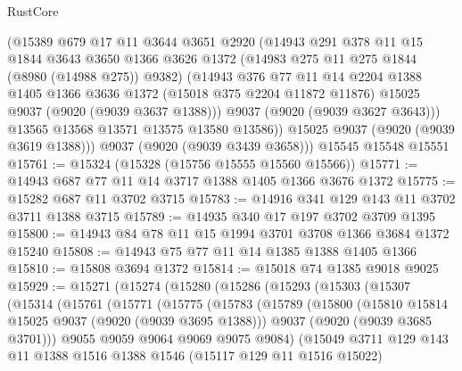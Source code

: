 \begin{lexlean}{RustCore}
\begin{coremodule}
          (@15389
            @679
            @17
            @11
            @3644
            @3651
            @2920
            (@14943
              @291
              @378
              @11
              @15
              @1844
              @3643
              @3650
              @1366
              @3626
              @1372
              (@14983 @275 @11 @275 @1844 (@8980 (@14988 @275)) @9382)
              (@14943
                @376
                @77
                @11
                @14
                @2204
                @1388
                @1405
                @1366
                @3636
                @1372
                (@15018 @375 @2204 @11872 @11876)
                @15025
                @9037
                (@9020 (@9039 @3637 @1388)))
              @9037
              (@9020 (@9039 @3627 @3643)))
            @13565
            @13568
            @13571
            @13575
            @13580
            @13586))
        @15025
        @9037
        (@9020 (@9039 @3619 @1388)))
      @9037
      (@9020 (@9039 @3439 @3658)))
    @15545
    @15548
    @15551
@15761 := @15324 (@15328 (@15756 @15555 @15560 @15566))
@15771 := @14943 @687 @77 @11 @14 @3717 @1388 @1405 @1366 @3676 @1372
@15775 := @15282 @687 @11 @3702 @3715
@15783 := @14916 @341 @129 @143 @11 @3702 @3711 @1388 @3715
@15789 := @14935 @340 @17 @197 @3702 @3709 @1395
@15800 := @14943 @84 @78 @11 @15 @1994 @3701 @3708 @1366 @3684 @1372 @15240
@15808 := @14943 @75 @77 @11 @14 @1385 @1388 @1405 @1366
@15810 := @15808 @3694 @1372
@15814 := @15018 @74 @1385 @9018 @9025
@15929 := @15271
    (@15274
      (@15280
        (@15286
          (@15293
            (@15303
              (@15307
                (@15314
                  (@15761
                    (@15771
                      (@15775
                        (@15783
                          (@15789
                            (@15800
                              (@15810 @15814 @15025 @9037 (@9020 (@9039 @3695 @1388)))
                              @9037
                              (@9020 (@9039 @3685 @3701)))
                            @9055
                            @9059
                            @9064
                            @9069
                            @9075
                            @9084)
                          (@15049
                            @3711
                            @129
                            @143
                            @11
                            @1388
                            @1516
                            @1388
                            @1546
                            (@15117 @129 @11 @1516 @15022)

\end{coremodule}
\end{lexlean}
